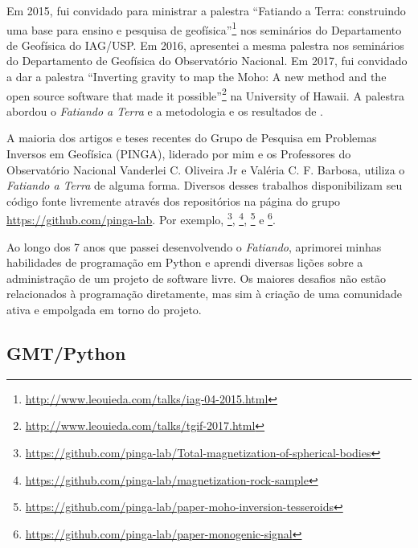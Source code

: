 Em 2015, fui convidado para ministrar a palestra ``Fatiando a Terra:
construindo uma base para ensino e pesquisa de
geofísica''\footnote{\url{http://www.leouieda.com/talks/iag-04-2015.html}} nos
seminários do Departamento de Geofísica do IAG/USP.
Em 2016, apresentei a mesma palestra nos seminários do Departamento de
Geofísica do Observatório Nacional.
Em 2017, fui convidado a dar a palestra ``Inverting gravity to map the Moho: A
new method and the open source software that made it
possible''\footnote{\url{http://www.leouieda.com/talks/tgif-2017.html}}
na University of Hawaii.
A palestra abordou o \textit{Fatiando a Terra} e a metodologia e os resultados
de \citet{moho}.

A maioria dos artigos e teses recentes do Grupo de Pesquisa em Problemas
Inversos em Geofísica (PINGA), liderado por mim e os Professores do
Observatório Nacional
Vanderlei C. Oliveira Jr e Valéria C. F. Barbosa,
utiliza o \textit{Fatiando a Terra} de alguma forma.
Diversos desses trabalhos disponibilizam seu código fonte livremente através
dos repositórios na página do grupo \url{https://github.com/pinga-lab}.
Por exemplo,
\citet{magdir}\footnote{\url{https://github.com/pinga-lab/Total-magnetization-of-spherical-bodies}},
\citet{reis2016}\footnote{\url{https://github.com/pinga-lab/magnetization-rock-sample}},
\citet{moho}\footnote{\url{https://github.com/pinga-lab/paper-moho-inversion-tesseroids}}
e
\citet{monogenic2017}\footnote{\url{https://github.com/pinga-lab/paper-monogenic-signal}}.

Ao longo dos 7 anos que passei desenvolvendo o \textit{Fatiando},
aprimorei minhas habilidades de programação em Python e aprendi diversas lições
sobre a administração de um projeto de software livre.
Os maiores desafios não estão relacionados à programação diretamente, mas sim à
criação de uma comunidade ativa e empolgada em torno do projeto.


\subsection{GMT/Python}

